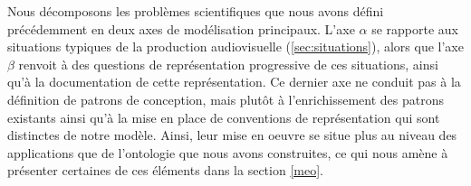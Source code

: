 Nous décomposons les problèmes scientifiques que nous avons défini précédemment en deux axes de modélisation principaux. 
L'axe $\alpha$ se rapporte aux situations typiques de la production audiovisuelle (\ref{sec:situations}), alors que l'axe $\beta$ renvoit à des questions de représentation progressive de ces situations, ainsi qu'à la documentation de cette représentation.
Ce dernier axe ne conduit pas à la définition de patrons de conception, mais plutôt à l'enrichissement des patrons existants ainsi qu'à la mise en place de conventions de représentation qui sont distinctes de notre modèle.
Ainsi, leur mise en oeuvre se situe plus au niveau des applications que de l'ontologie que nous avons construites, ce qui nous amène à présenter certaines de ces éléments dans la section \ref{meo}.



